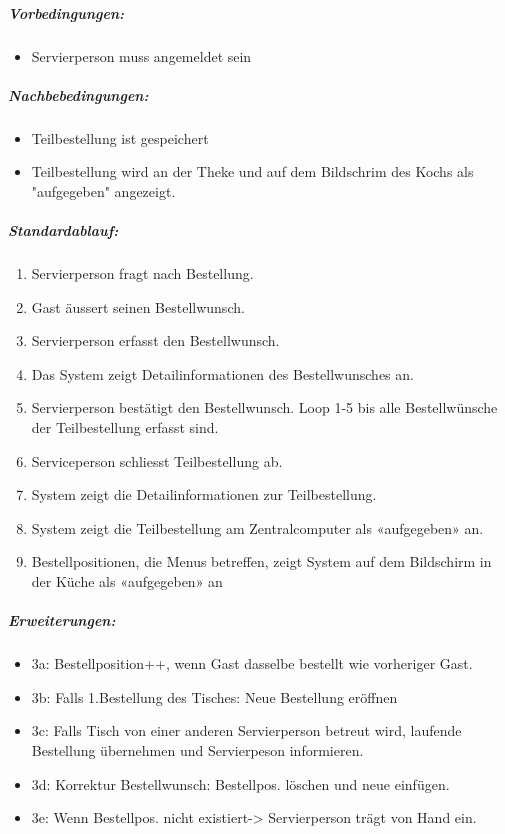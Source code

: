 \documentclass{article}
\begin{document}
\subparagraph{Vorbedingungen: \\}
\begin{itemize}
	\item Servierperson muss angemeldet sein
\end{itemize}


\subparagraph{Nachbebedingungen: \\}
\begin{itemize}
	\item Teilbestellung ist gespeichert
	\item Teilbestellung wird an der Theke und auf dem Bildschrim des Kochs als "aufgegeben" angezeigt.
\end{itemize}


\subparagraph{Standardablauf: \\}
\begin{enumerate}
	\item Servierperson fragt nach Bestellung.
	\item Gast äussert seinen Bestellwunsch.
	\item Servierperson erfasst den Bestellwunsch.
	\item Das System zeigt Detailinformationen des Bestellwunsches an.
	\item Servierperson bestätigt den Bestellwunsch. Loop 1-5 bis alle Bestellwünsche der Teilbestellung erfasst sind.
	\item Serviceperson schliesst Teilbestellung ab.
	\item System zeigt die Detailinformationen zur Teilbestellung.
	\item System zeigt die Teilbestellung am Zentralcomputer als «aufgegeben» an. 
	\item Bestellpositionen, die Menus betreffen, zeigt System auf dem Bildschirm in der Küche 
als «aufgegeben» an
\end{enumerate}


\subparagraph{Erweiterungen: \\}
\begin{itemize}
	\item 3a: Bestellposition++, wenn Gast dasselbe bestellt wie vorheriger Gast.
	\item 3b: Falls 1.Bestellung des Tisches: Neue Bestellung eröffnen
	\item 3c: Falls Tisch von einer anderen Servierperson betreut wird, laufende Bestellung übernehmen und Servierpeson informieren.
	\item 3d: Korrektur Bestellwunsch: Bestellpos. löschen und neue einfügen.
	\item 3e: Wenn Bestellpos. nicht existiert-> Servierperson trägt von Hand ein.
\end{itemize}
\end{document}
